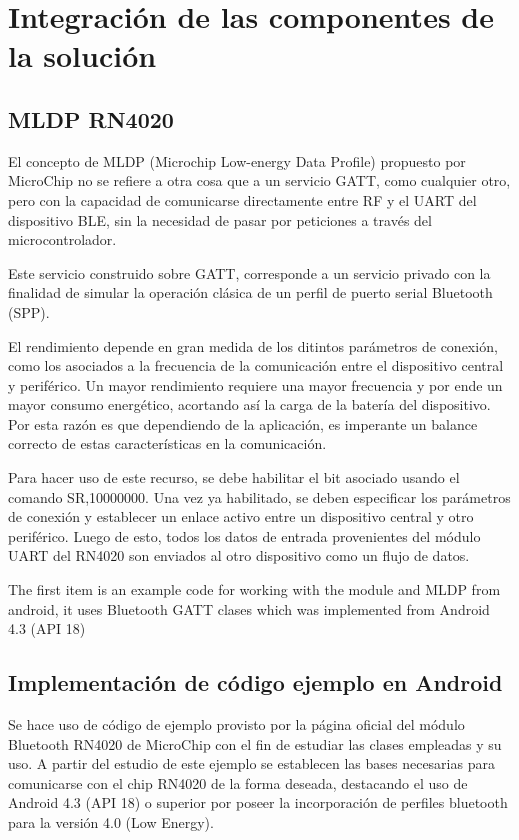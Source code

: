 \chapter{Integración de las componentes de la solución}\label{mldp}

\section{MLDP RN4020}

El concepto de MLDP (Microchip Low-energy Data Profile) propuesto por MicroChip no se refiere a otra cosa que a un servicio GATT, como cualquier otro, pero con la capacidad de comunicarse directamente entre RF y el UART del dispositivo BLE, sin la necesidad de pasar por peticiones a través del microcontrolador.

Este servicio construido sobre GATT, corresponde a un servicio privado con la finalidad de simular la operación clásica de un perfil de puerto serial Bluetooth (SPP).

El rendimiento depende en gran medida de los ditintos parámetros de conexión, como los asociados a la frecuencia de la comunicación entre el dispositivo central y periférico. Un mayor rendimiento requiere una mayor frecuencia y por ende un mayor consumo energético, acortando así la carga de la batería del dispositivo. Por esta razón es que dependiendo de la aplicación, es imperante un balance correcto de estas características en la comunicación.

Para hacer uso de este recurso, se debe habilitar el bit asociado usando el comando SR,10000000. Una vez ya habilitado, se deben especificar los parámetros de conexión y establecer un enlace activo entre un dispositivo central y otro periférico. Luego de esto, todos los datos de entrada provenientes del módulo UART del RN4020 son enviados al otro dispositivo como un flujo de datos.

The first item is an example code for working with the module and MLDP from android, it uses Bluetooth GATT clases which was implemented from Android 4.3 (API 18)

\section{Implementación de código ejemplo en Android}

Se hace uso de código de ejemplo provisto por la página oficial del módulo Bluetooth RN4020 de MicroChip \cite{RN4020_code} con el fin de estudiar las clases empleadas y su uso. A partir del estudio de este ejemplo se establecen las bases necesarias para comunicarse con el chip RN4020 de la forma deseada, destacando el uso de Android 4.3 (API 18) o superior por poseer la incorporación de perfiles bluetooth para la versión 4.0 (Low Energy). 


